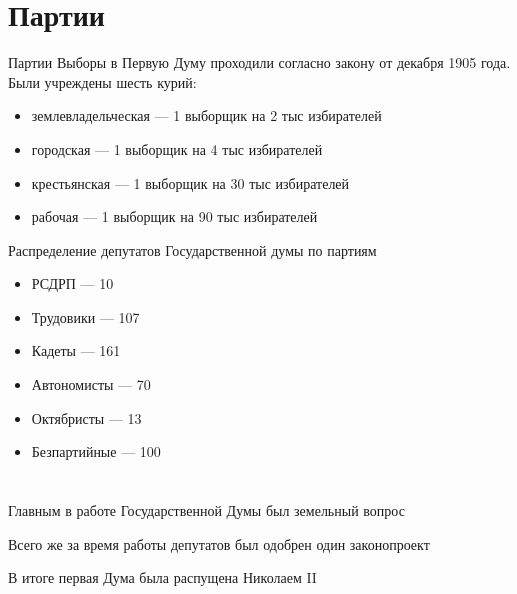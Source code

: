 \section{Партии}
\begin{frame}{Партии}
    Выборы в Первую Думу проходили согласно закону от декабря 1905 года. Были учреждены шесть курий:
	\begin{itemize}

		\item землевладельческая --- 1 выборщик на 2 тыс избирателей

		\item городская --- 1 выборщик на 4 тыс избирателей

		\item крестьянская --- 1 выборщик на 30 тыс избирателей

		\item рабочая --- 1 выборщик на 90 тыс избирателей

	\end{itemize}
\end{frame}

\begin{frame}
Распределение депутатов Государственной думы по партиям
	\begin{itemize}

		\item РСДРП --- 10

		\item Трудовики --- 107

		\item Кадеты --- 161

		\item Автономисты --- 70

		\item Октябристы --- 13

		\item Безпартийные --- 100
	\end{itemize}


\end{frame}

\section{}
\begin{frame}{}

	\Large{Главным в работе Государственной Думы был земельный вопрос

	Всего же за время работы депутатов был одобрен один законопроект

	В итоге первая Дума была распущена Николаем II}

\end{frame}

